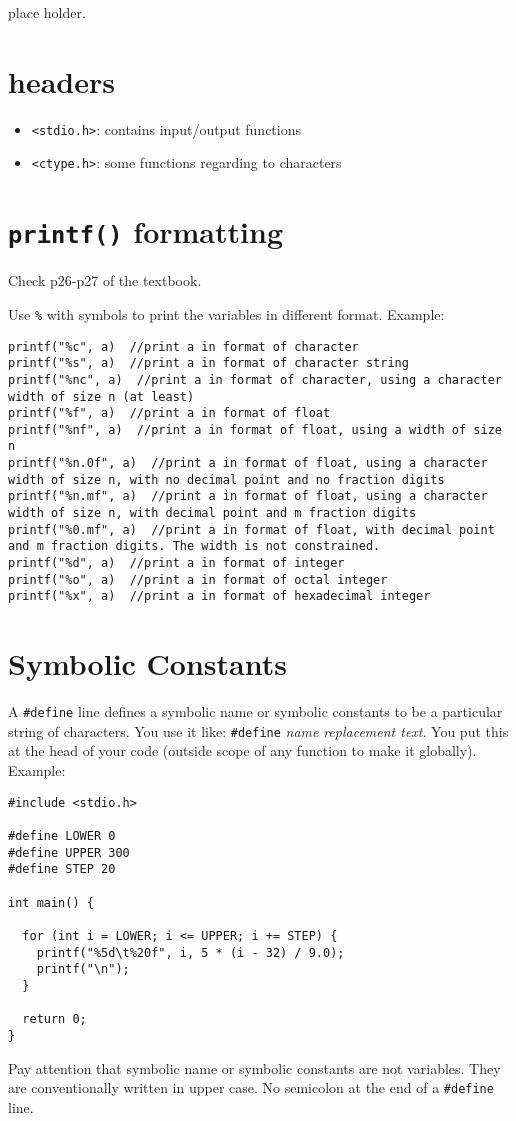 \documentclass[12pt]{article}
\begin{document}
place holder.

\section{headers}
\label{sec:org73706f2}
\begin{itemize}
\item \texttt{<stdio.h>}: contains input/output functions
\item \texttt{<ctype.h>}: some functions regarding to characters
\end{itemize}

\section{\texttt{printf()} formatting}
\label{sec:org8b40bda}
Check p26-p27 of the textbook.

Use \texttt{\%} with symbols to print the variables in different format.
Example:
\begin{verbatim}
printf("%c", a)  //print a in format of character
printf("%s", a)  //print a in format of character string
printf("%nc", a)  //print a in format of character, using a character width of size n (at least)
printf("%f", a)  //print a in format of float
printf("%nf", a)  //print a in format of float, using a width of size n
printf("%n.0f", a)  //print a in format of float, using a character width of size n, with no decimal point and no fraction digits
printf("%n.mf", a)  //print a in format of float, using a character width of size n, with decimal point and m fraction digits
printf("%0.mf", a)  //print a in format of float, with decimal point and m fraction digits. The width is not constrained.
printf("%d", a)  //print a in format of integer
printf("%o", a)  //print a in format of octal integer
printf("%x", a)  //print a in format of hexadecimal integer
\end{verbatim}
\section{Symbolic Constants}
\label{sec:orgbbfea9f}
A \texttt{\#define} line defines a symbolic name or symbolic constants to be a particular string of characters. You use it like: \texttt{\#define} \emph{name} \emph{replacement text}. You put this at the head of your code (outside scope of any function to make it globally). Example:
\begin{verbatim}
#include <stdio.h>

#define LOWER 0
#define UPPER 300
#define STEP 20

int main() {

  for (int i = LOWER; i <= UPPER; i += STEP) {
    printf("%5d\t%20f", i, 5 * (i - 32) / 9.0);
    printf("\n");
  }

  return 0;
}
\end{verbatim}
Pay attention that symbolic name or symbolic constants are not variables. They are conventionally written in upper case. No semicolon at the end of a \texttt{\#define} line.
\end{document}
